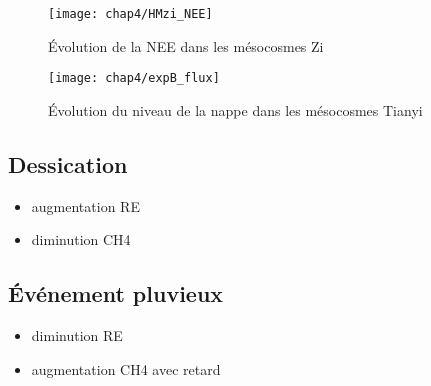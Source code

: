 \begin{figure}
\centering
\texttt{[image: chap4/HMzi\_NEE]}
\caption{Évolution de la NEE dans les mésocosmes Zi}
\label{fig:HMzi_NEE}
\end{figure}


\begin{figure}
\centering
\texttt{[image: chap4/expB\_flux]}
\caption{Évolution du niveau de la nappe dans les mésocosmes Tianyi}
\label{fig:HMty_wtl}
\end{figure}

%
%
%

\subsection{Dessication}

\begin{itemize}
\item augmentation RE
\item diminution CH4
\end{itemize}

\subsection{Événement pluvieux}

\begin{itemize}
\item diminution RE
\item augmentation CH4 avec retard
\end{itemize}

